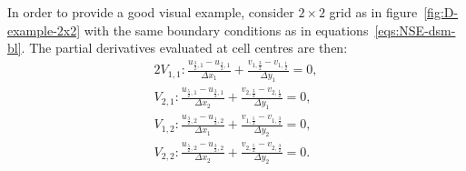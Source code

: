 \documentclass{article}
\begin{document}
In order to provide a good visual example, consider $2 \times 2$ grid as in figure~\ref{fig:D-example-2x2} with the same boundary conditions as in equations~\eqref{eqs:NSE-dsm-bl}. The partial derivatives evaluated at cell centres are then: 
\begin{alignat*}{2}
	V_{1,1}:\frac{u_{\frac{3}{2},1} - u_{\frac{1}{2},1}}{\Delta x_1}+\frac{v_{1,\frac{3}{2}} - v_{1,\frac{1}{2}}}{\Delta y_1}=0,\\
	V_{2,1}: \frac{u_{\frac{5}{2},1} - u_{\frac{3}{2},1}}{\Delta x_2}+\frac{v_{2,\frac{3}{2}} - v_{2,\frac{1}{2}}}{\Delta y_1}=0,\\
	V_{1,2}:\frac{u_{\frac{3}{2},2} - u_{\frac{1}{2},2}}{\Delta x_1}+\frac{v_{1,\frac{5}{2}} - v_{1,\frac{3}{2}}}{\Delta y_2}=0,\\
	V_{2,2}:\frac{u_{\frac{5}{2},2} - u_{\frac{3}{2},2}}{\Delta x_2}+\frac{v_{2,\frac{5}{2}} - v_{2,\frac{3}{2}}}{\Delta y_2}=0.
\end{alignat*}

\end{document}
